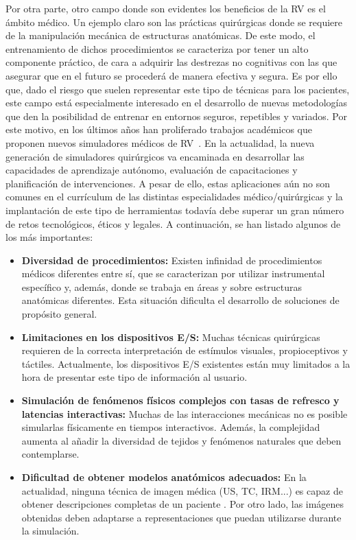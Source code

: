 Por otra parte, otro campo donde son evidentes los beneficios de la \ac{RV} es  el ámbito médico. Un ejemplo claro son las prácticas quirúrgicas donde se requiere de la manipulación mecánica de estructuras anatómicas. De este modo, el entrenamiento de dichos procedimientos se caracteriza por tener un alto componente práctico, de cara a adquirir las destrezas no cognitivas con las que asegurar que en el futuro se procederá de manera efectiva y segura.
Es por ello que, dado el riesgo que suelen representar este tipo de técnicas para los pacientes, este campo está especialmente interesado en el desarrollo de nuevas metodologías que den la posibilidad de entrenar en entornos seguros, repetibles y variados. Por este motivo, en los últimos años han proliferado trabajos académicos que proponen nuevos simuladores médicos de \ac{RV}~\cite{korzeniowski2018vcsim3,cecil2017advanced}. En la actualidad, la nueva generación de simuladores quirúrgicos va encaminada en desarrollar las capacidades de aprendizaje autónomo, evaluación de capacitaciones y planificación de intervenciones. A pesar de ello, estas aplicaciones aún no son comunes en el currículum de las distintas especialidades médico/quirúrgicas y la implantación de este tipo de herramientas todavía debe superar un gran número de retos tecnológicos, éticos y legales. A continuación, se han listado algunos de los más importantes:
\begin{itemize}
    \item \textbf{Diversidad de procedimientos:} Existen infinidad de procedimientos médicos diferentes entre sí, que se caracterizan por utilizar instrumental específico y, además, donde se trabaja en áreas y sobre estructuras anatómicas diferentes. Esta situación dificulta el desarrollo de soluciones de propósito general.
    \item \textbf{Limitaciones en los dispositivos \ac{E/S}:} Muchas técnicas quirúrgicas requieren de la correcta interpretación de estímulos visuales,  propioceptivos y táctiles. Actualmente, los dispositivos E/S existentes están muy limitados a la hora de presentar este tipo de información al usuario. 
    \item \textbf{Simulación de fenómenos físicos complejos con tasas de refresco y latencias interactivas:} Muchas de las interacciones mecánicas no es posible simularlas físicamente en tiempos interactivos. Además, la complejidad aumenta al añadir la diversidad de tejidos y fenómenos naturales que deben contemplarse. 
    \item \textbf{Dificultad de obtener modelos anatómicos adecuados:} En la actualidad, ninguna técnica de imagen médica (\ac{US}, \ac{TC}, \ac{IRM}...) es capaz de obtener descripciones completas de un paciente \cite{mita}. Por otro lado, las imágenes obtenidas deben adaptarse a representaciones que puedan utilizarse durante la simulación.
\end{itemize}
